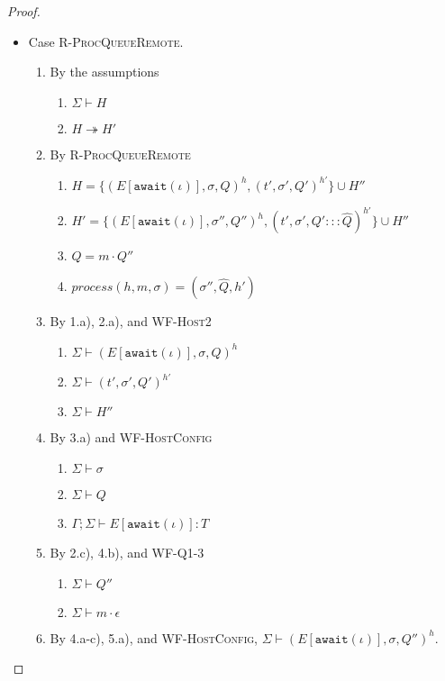 \begin{proof}
\begin{itemize}
\item Case \textsc{R-ProcQueueRemote}.
\begin{enumerate}
\item By the assumptions
  \begin{enumerate}[label=(\alph*)]
  \item $\Sigma \vdash H$
  \item $H \twoheadrightarrow H'$
  \end{enumerate}
\item By \textsc{R-ProcQueueRemote}
  \begin{enumerate}[label=(\alph*)]
  \item $H = \{ (E[\texttt{await}(\iota)], \sigma, Q)^h, (t', \sigma', Q')^{h'} \} \cup H''$
  \item $H' = \{ (E[\texttt{await}(\iota)], \sigma'', Q'')^h, (t', \sigma', Q' ::: \hat{Q})^{h'} \} \cup H''$
  \item $Q        = m \cdot Q''$
  \item $process(h, m, \sigma) = (\sigma'', \hat{Q}, h')$
  \end{enumerate}
\item By 1.a), 2.a), and \textsc{WF-Host2}
  \begin{enumerate}[label=(\alph*)]
  \item $\Sigma \vdash (E[\texttt{await}(\iota)], \sigma, Q)^h$
  \item $\Sigma \vdash (t', \sigma', Q')^{h'}$
  \item $\Sigma \vdash H''$
  \end{enumerate}
\item By 3.a) and \textsc{WF-HostConfig}
  \begin{enumerate}[label=(\alph*)]
  \item $\Sigma \vdash \sigma$
  \item $\Sigma \vdash Q$
  \item $\Gamma ; \Sigma \vdash E[\texttt{await}(\iota)] : T$
  \end{enumerate}
\item By 2.c), 4.b), and \textsc{WF-Q1-3}
  \begin{enumerate}[label=(\alph*)]
  \item $\Sigma \vdash Q''$
  \item $\Sigma \vdash m \cdot \epsilon$
  \end{enumerate}
\item By 4.a-c), 5.a), and \textsc{WF-HostConfig}, $\Sigma \vdash (E[\texttt{await}(\iota)], \sigma, Q'')^h$.

\end{enumerate}
\end{itemize}
\end{proof}
